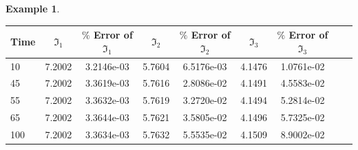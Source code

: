 \documentclass[11pt,a4paper]{amsart}
\theoremstyle{plain}
\theoremstyle{definition}
\newtheorem{example}[theorem]{Example}
\theoremstyle{remark}
\numberwithin{equation}{section}
\begin{document}
\begin{example}
\begin{table}[htbp!]
\centering
{}
\setlength{\tabcolsep}{0pt}
\begin{tabular*}{\textwidth}{@{\extracolsep{\fill}} l *{8}{c} }
\toprule
\textbf{Time} &
$\mathfrak{I}_1$ & $\%$ Error of $\mathfrak{I}_1$ & $\mathfrak{I}_2$ & $\%$ Error of $\mathfrak{I}_2$ & $\mathfrak{I}_3$ & $\%$ Error of $\mathfrak{I}_3$\\
\midrule
 10& 7.2002 & 3.2146e-03 & 5.7604 & 6.5176e-03 & 4.1476 & 1.0761e-02\\
 45& 7.2002 & 3.3619e-03 & 5.7616 & 2.8086e-02 & 4.1491 & 4.5583e-02\\
 55& 7.2002 & 3.3632e-03 & 5.7619 & 3.2720e-02 & 4.1494 & 5.2814e-02\\
 65& 7.2002 & 3.3644e-03 & 5.7621 & 3.5805e-02 & 4.1496 & 5.7325e-02\\
 100& 7.2002 & 3.3634e-03 & 5.7632 & 5.5535e-02 & 4.1509 & 8.9002e-02\\
 \bottomrule
\end{tabular*}\label{Table:E4}
\end{table}


\end{example}
\end{document}
